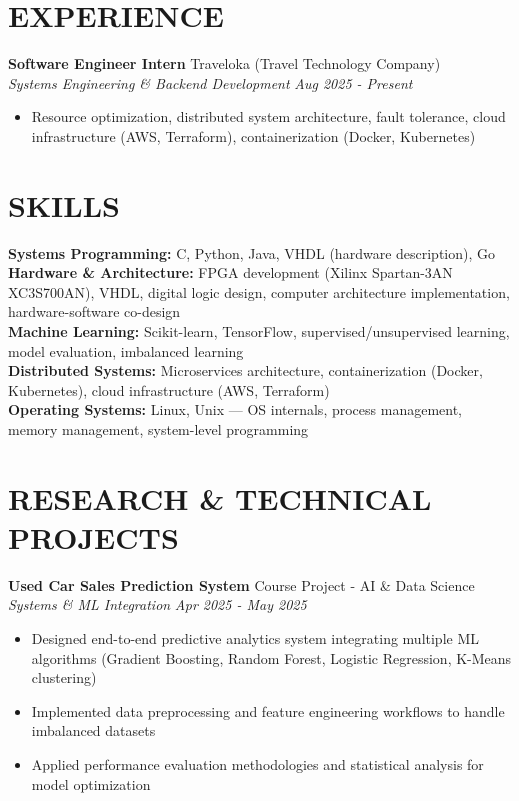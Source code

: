 \documentclass[10pt,a4paper]{article}
\newcommand{\experienceheader}[4]{
    \textbf{#1} \hfill #2 \\
    \textit{#3} \hfill \textit{#4}
}
\begin{document}
\section*{EXPERIENCE}

\experienceheader{Software Engineer Intern}{Traveloka (Travel Technology Company)}{Systems Engineering \& Backend Development}{Aug 2025 - Present}
\begin{itemize}[leftmargin=*, itemsep=1pt, topsep=1pt]
    \item Resource optimization, distributed system architecture, fault tolerance, cloud infrastructure (AWS, Terraform), containerization (Docker, Kubernetes)
\end{itemize}

\section*{SKILLS}

\textbf{Systems Programming:} C, Python, Java, VHDL (hardware description), Go \\
\textbf{Hardware \& Architecture:} FPGA development (Xilinx Spartan-3AN XC3S700AN), VHDL, digital logic design, computer architecture implementation, hardware-software co-design \\
\textbf{Machine Learning:} Scikit-learn, TensorFlow, supervised/unsupervised learning, model evaluation, imbalanced learning \\
\textbf{Distributed Systems:} Microservices architecture, containerization (Docker, Kubernetes), cloud infrastructure (AWS, Terraform) \\
\textbf{Operating Systems:} Linux, Unix — OS internals, process management, memory management, system-level programming

\section*{RESEARCH \& TECHNICAL PROJECTS}

\experienceheader{Used Car Sales Prediction System}{Course Project - AI \& Data Science}{Systems \& ML Integration}{Apr 2025 - May 2025}
\begin{itemize}[leftmargin=*, itemsep=1pt, topsep=1pt]
    \item Designed end-to-end predictive analytics system integrating multiple ML algorithms (Gradient Boosting, Random Forest, Logistic Regression, K-Means clustering)
    \item Implemented data preprocessing and feature engineering workflows to handle imbalanced datasets
    \item Applied performance evaluation methodologies and statistical analysis for model optimization
\end{itemize}
\end{document}
